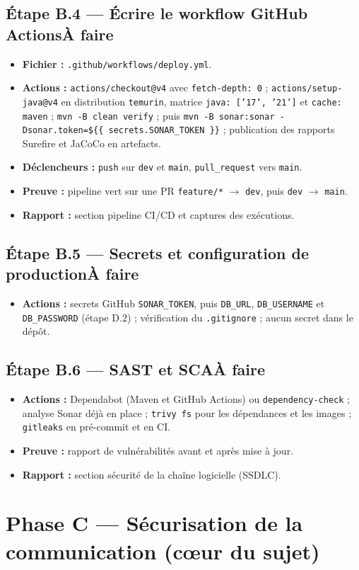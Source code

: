 \documentclass[12pt,a4paper]{article}
\newcommand{\code}[1]{\texttt{\small #1}}
\newcommand{\fait}{\hfill\textcolor{green!45!black}{\small\textbf{Fait}}}
\newcommand{\afaire}{\hfill\textcolor{orange!80!black}{\small\textbf{\`A faire}}}
\newcommand{\etape}[2]{%
  \subsection*{#1\ifstrequal{#2}{f}{\fait}{\afaire}}%
}
\begin{document}
\etape{\'Etape B.4 --- \'Ecrire le workflow GitHub Actions}{a}
\begin{itemize}[leftmargin=1.4em,itemsep=0.1em]
  \item \textbf{Fichier :} \code{.github/workflows/deploy.yml}.
  \item \textbf{Actions :} \code{actions/checkout@v4} avec \code{fetch-depth: 0} ;
        \code{actions/setup-java@v4} en distribution \code{temurin}, matrice
        \code{java: ['17', '21']} et \code{cache: maven} ; \code{mvn -B clean verify} ;
        puis \code{mvn -B sonar:sonar -Dsonar.token=\$\{\{ secrets.SONAR\_TOKEN \}\}} ;
        publication des rapports Surefire et JaCoCo en artefacts.
  \item \textbf{D\'eclencheurs :} \code{push} sur \code{dev} et \code{main},
        \code{pull\_request} vers \code{main}.
  \item \textbf{Preuve :} pipeline vert sur une PR \code{feature/*} $\rightarrow$ \code{dev},
        puis \code{dev} $\rightarrow$ \code{main}.
  \item \textbf{Rapport :} section pipeline CI/CD et captures des ex\'ecutions.
\end{itemize}

\etape{\'Etape B.5 --- Secrets et configuration de production}{a}
\begin{itemize}[leftmargin=1.4em,itemsep=0.1em]
  \item \textbf{Actions :} secrets GitHub \code{SONAR\_TOKEN}, puis \code{DB\_URL},
        \code{DB\_USERNAME} et \code{DB\_PASSWORD} (\'etape D.2) ; v\'erification du
        \code{.gitignore} ; aucun secret dans le d\'ep\^ot.
\end{itemize}

\etape{\'Etape B.6 --- SAST et SCA}{a}
\begin{itemize}[leftmargin=1.4em,itemsep=0.1em]
  \item \textbf{Actions :} Dependabot (Maven et GitHub Actions) ou \code{dependency-check} ;
        analyse Sonar d\'ej\`a en place ; \code{trivy fs} pour les d\'ependances et les images ;
        \code{gitleaks} en pr\'e-commit et en CI.
  \item \textbf{Preuve :} rapport de vuln\'erabilit\'es avant et apr\`es mise \`a jour.
  \item \textbf{Rapport :} section s\'ecurit\'e de la cha\^ine logicielle (SSDLC).
\end{itemize}

\section{Phase C --- S\'ecurisation de la communication (c\oe{}ur du sujet)}
\end{document}
